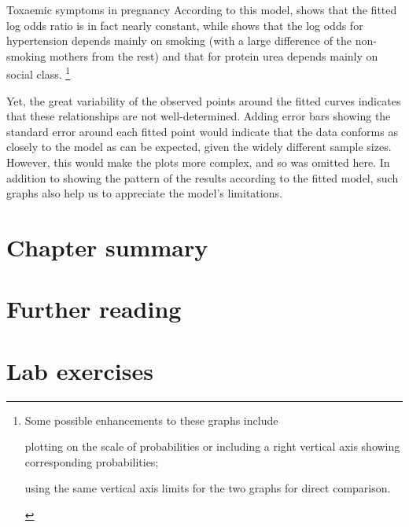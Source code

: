 \documentclass[11pt]{book}\usepackage[]{graphicx}\usepackage[]{color}
\begin{document}
\begin{Example}[toxaemia]{Toxaemic symptoms in pregnancy}
According to this model,  shows
that the fitted log odds ratio is in fact nearly constant,
while  shows that
the log odds for hypertension depends mainly on smoking
(with a large difference of the non-smoking mothers from the rest)
and that for protein urea depends mainly on social class.%
\footnote{
Some possible enhancements to these graphs include
\begin{seriate}
 \item plotting on the scale of probabilities or including a right vertical axis
 showing corresponding probabilities;
 \item using the same vertical axis limits for the two graphs for direct comparison.
\end{seriate}
}

Yet, the great variability of the observed points around the fitted
curves indicates that these relationships are not well-determined.
Adding error bars showing the standard error around each fitted point
would indicate that the data conforms as closely to the model as
can be expected, given the widely different sample sizes.
However, this would make the plots more complex, and so was omitted
here.
In addition to showing the pattern of the results according to the fitted
model, such graphs also help us to appreciate the model's limitations.


\end{Example}




\section{Chapter summary}\label{sec:loglin-summary}


\section{Further reading}\label{sec:loglin-reading}

\section{Lab exercises}\label{sec:loglin-lab}
\end{document}
